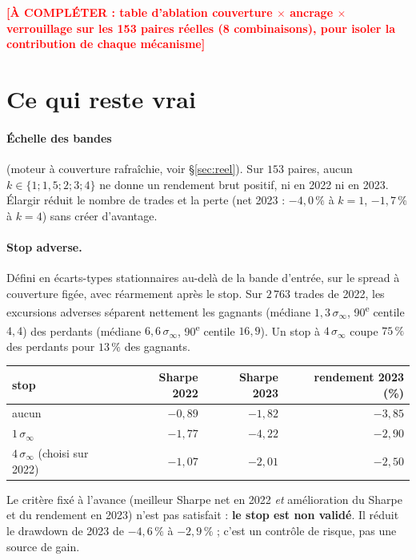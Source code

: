 \documentclass[11pt,a4paper]{article}
\theoremstyle{remark}
\newcommand{\sinf}{\sigma_\infty}
\newcommand{\acompleter}[1]{\textcolor{red}{\textbf{[À COMPLÉTER : #1]}}}
\begin{document}
\acompleter{table d'ablation couverture $\times$ ancrage $\times$ verrouillage sur les 153 paires réelles (8 combinaisons), pour isoler la contribution de chaque mécanisme}

\section{Ce qui reste vrai}\label{sec:reste}

\paragraph{Échelle des bandes} (moteur à couverture rafraîchie, voir \S\ref{sec:reel}). Sur $153$ paires, aucun $k\in\{1;1{,}5;2;3;4\}$ ne donne un rendement brut positif, ni en 2022 ni en 2023. Élargir réduit le nombre de trades et la perte (net 2023 : $-4{,}0\,\%$ à $k=1$, $-1{,}7\,\%$ à $k=4$) sans créer d'avantage.

\paragraph{Stop adverse.} Défini en écarts-types stationnaires au-delà de la bande d'entrée, sur le spread à couverture figée, avec réarmement après le stop.
Sur $2\,763$ trades de 2022, les excursions adverses séparent nettement les gagnants (médiane $1{,}3\,\sinf$, 90\textsuperscript{e} centile $4{,}4$) des perdants (médiane $6{,}6\,\sinf$, 90\textsuperscript{e} centile $16{,}9$). Un stop à $4\,\sinf$ coupe $75\,\%$ des perdants pour $13\,\%$ des gagnants.

\begin{center}
\small
\begin{tabular}{lrrr}
\toprule
stop & Sharpe 2022 & Sharpe 2023 & rendement 2023 (\%)\\
\midrule
aucun & $-0{,}89$ & $-1{,}82$ & $-3{,}85$\\
$1\,\sinf$ & $-1{,}77$ & $-4{,}22$ & $-2{,}90$\\
$4\,\sinf$ (choisi sur 2022) & $-1{,}07$ & $-2{,}01$ & $-2{,}50$\\
\bottomrule
\end{tabular}
\end{center}

Le critère fixé à l'avance (meilleur Sharpe net en 2022 \emph{et} amélioration du Sharpe et du rendement en 2023) n'est pas satisfait : \textbf{le stop est non validé}. Il réduit le drawdown de 2023 de $-4{,}6\,\%$ à $-2{,}9\,\%$ ; c'est un contrôle de risque, pas une source de gain.
\end{document}
